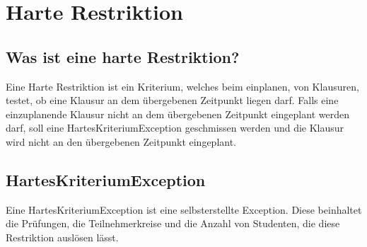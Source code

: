 \section{Harte Restriktion}\label{sec:Harte Restriktion}

\subsection{Was ist eine harte Restriktion?}
Eine Harte Restriktion ist ein Kriterium, welches beim einplanen, von Klausuren, testet,
ob eine Klausur an dem übergebenen Zeitpunkt liegen darf.
Falls eine einzuplanende Klausur nicht an dem übergebenen Zeitpunkt eingeplant werden darf,
soll eine HartesKriteriumException geschmissen werden und die Klausur wird nicht an den übergebenen
Zeitpunkt eingeplant.

\subsection{HartesKriteriumException}
Eine HartesKriteriumException ist eine selbsterstellte Exception.
Diese beinhaltet die Prüfungen, die Teilnehmerkreise und die Anzahl von Studenten, die diese Restriktion auslösen lässt.


